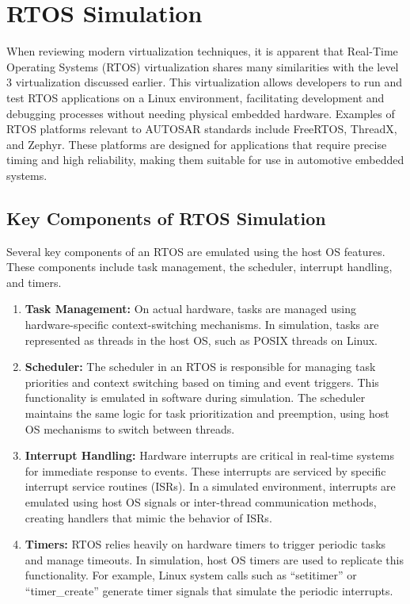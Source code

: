 \section{RTOS Simulation}\label{sec:RTOS}
When reviewing modern virtualization techniques, it is apparent that Real-Time Operating Systems (RTOS) virtualization shares many similarities with the level 3 virtualization discussed earlier.
This virtualization allows developers to run and test RTOS applications on a Linux environment, facilitating development and debugging processes without needing physical embedded hardware. Examples of RTOS platforms relevant to AUTOSAR standards include FreeRTOS, ThreadX, and Zephyr. These platforms are designed for applications that require precise timing and high reliability, making them suitable for use in automotive embedded systems.  
 
\subsection{Key Components of RTOS Simulation}
Several key components of an RTOS are emulated using the host OS features. These components include task management, the scheduler, interrupt handling, and timers.
\begin{enumerate}

\item \textbf{Task Management:} On actual hardware, tasks are managed using hardware-specific context-switching mechanisms. In simulation, tasks are represented as threads in the host OS, such as POSIX threads on Linux.

\item \textbf{Scheduler:} The scheduler in an RTOS is responsible for managing task priorities and context switching based on timing and event triggers. This functionality is emulated in software during simulation. The scheduler maintains the same logic for task prioritization and preemption, using host OS mechanisms to switch between threads.

\item \textbf{Interrupt Handling:} Hardware interrupts are critical in real-time systems for immediate response to events. These interrupts are serviced by specific interrupt service routines (ISRs). In a simulated environment, interrupts are emulated using host OS signals or inter-thread communication methods, creating handlers that mimic the behavior of ISRs.

\item \textbf{Timers:} RTOS relies heavily on hardware timers to trigger periodic tasks and manage timeouts. In simulation, host OS timers are used to replicate this functionality. For example, Linux system calls such as “setitimer” or “timer\_create” generate timer signals that simulate the periodic interrupts.
\end{enumerate}

